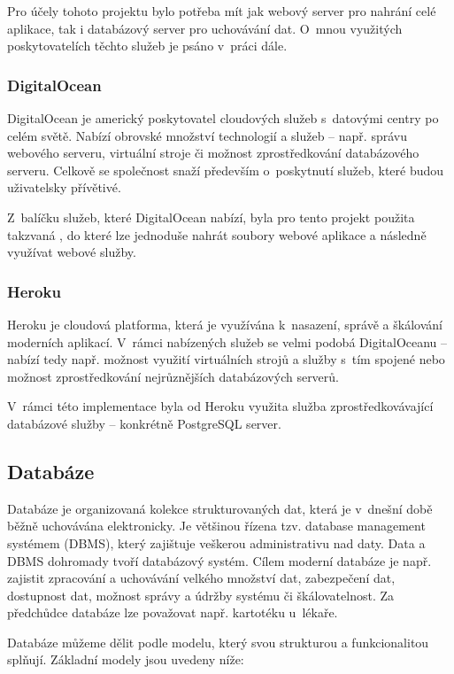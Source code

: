 	Pro účely tohoto projektu bylo potřeba mít jak webový server pro nahrání celé aplikace, tak i databázový server pro uchovávání dat. O~mnou využitých poskytovatelích těchto služeb je psáno v~práci dále. 
	
		\subsubsection{DigitalOcean}
		DigitalOcean je americký poskytovatel cloudových služeb s~datovými centry po celém světě. Nabízí obrovské množství technologií a služeb – např. správu webového serveru, virtuální stroje či možnost zprostředkování databázového serveru. Celkově se společnost snaží především o~poskytnutí služeb, které budou uživatelsky přívětivé. \cite{DO1}\cite{DO2}
		
		Z~balíčku služeb, které DigitalOcean nabízí, byla pro tento projekt použita takzvaná  \cite{DO3}, do které lze jednoduše nahrát soubory webové aplikace a následně využívat webové služby.
		
		\subsubsection{Heroku}
		Heroku je cloudová platforma, která je využívána k~nasazení, správě a škálování moderních aplikací. V~rámci nabízených služeb se velmi podobá DigitalOceanu – nabízí tedy např. možnost využití virtuálních strojů a služby s~tím spojené nebo možnost zprostředkování nejrůznějších databázových serverů. \cite{Heroku1}\cite{Heroku2}
		
		V~rámci této implementace byla od Heroku využita služba zprostředkovávající databázové služby – konkrétně PostgreSQL server. 
		
	\subsection{Databáze}
	Databáze je organizovaná kolekce strukturovaných dat, která je v~dnešní době běžně uchovávána elektronicky. Je většinou řízena tzv. database management systémem (DBMS), který zajištuje veškerou administrativu nad daty. Data a DBMS dohromady tvoří databázový systém. Cílem moderní databáze je např. zajistit zpracování a uchovávání velkého množství dat, zabezpečení dat, dostupnost dat, možnost správy a údržby systému či škálovatelnost. Za předchůdce databáze lze považovat např. kartotéku u~lékaře. \cite{DBSummary}
	
	
	
	Databáze můžeme dělit podle modelu, který svou strukturou a funkcionalitou splňují. Základní modely jsou uvedeny níže: \cite{DBModel}
		
